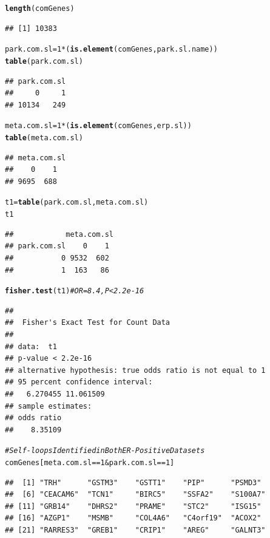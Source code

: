 \documentclass{article}\usepackage[]{graphicx}\usepackage[]{color}
\makeatletter
\newcommand{\hlnum}[1]{\textcolor[rgb]{0.686,0.059,0.569}{#1}}%
\newcommand{\hlcom}[1]{\textcolor[rgb]{0.678,0.584,0.686}{\textit{#1}}}%
\newcommand{\hlopt}[1]{\textcolor[rgb]{0,0,0}{#1}}%
\newcommand{\hlstd}[1]{\textcolor[rgb]{0.345,0.345,0.345}{#1}}%
\newcommand{\hlkwb}[1]{\textcolor[rgb]{0.69,0.353,0.396}{#1}}%
\newcommand{\hlkwd}[1]{\textcolor[rgb]{0.737,0.353,0.396}{\textbf{#1}}}%
\newenvironment{kframe}{%
 \def\at@end@of@kframe{}%
 \ifinner\ifhmode%
  \def\at@end@of@kframe{\end{minipage}}%
  \begin{minipage}{\columnwidth}%
 \fi\fi%
 \def\FrameCommand##1{\hskip\@totalleftmargin \hskip-\fboxsep
 \colorbox{shadecolor}{##1}\hskip-\fboxsep
     \hskip-\linewidth \hskip-\@totalleftmargin \hskip\columnwidth}%
 \MakeFramed {\advance\hsize-\width
   \@totalleftmargin\z@ \linewidth\hsize
   \@setminipage}}%
 {\par\unskip\endMakeFramed%
 \at@end@of@kframe}
\newenvironment{knitrout}{}{} %
\makeatother
\begin{document}
\begin{knitrout}
\begin{kframe}
\begin{alltt}
\hlkwd{length}\hlstd{(comGenes)}
\end{alltt}
\begin{verbatim}
## [1] 10383
\end{verbatim}
\begin{alltt}
\hlstd{park.com.sl}\hlkwb{=}\hlnum{1}\hlopt{*}\hlstd{(}\hlkwd{is.element}\hlstd{(comGenes,park.sl.name))}
\hlkwd{table}\hlstd{(park.com.sl)}
\end{alltt}
\begin{verbatim}
## park.com.sl
##     0     1 
## 10134   249
\end{verbatim}
\begin{alltt}
\hlstd{meta.com.sl}\hlkwb{=}\hlnum{1}\hlopt{*}\hlstd{(}\hlkwd{is.element}\hlstd{(comGenes,erp.sl))}
\hlkwd{table}\hlstd{(meta.com.sl)}
\end{alltt}
\begin{verbatim}
## meta.com.sl
##    0    1 
## 9695  688
\end{verbatim}
\begin{alltt}
\hlstd{t1}\hlkwb{=}\hlkwd{table}\hlstd{(park.com.sl,meta.com.sl)}
\hlstd{t1}
\end{alltt}
\begin{verbatim}
##            meta.com.sl
## park.com.sl    0    1
##           0 9532  602
##           1  163   86
\end{verbatim}
\begin{alltt}
\hlkwd{fisher.test}\hlstd{(t1)} \hlcom{#OR = 8.4, P < 2.2 e-16}
\end{alltt}
\begin{verbatim}
## 
## 	Fisher's Exact Test for Count Data
## 
## data:  t1
## p-value < 2.2e-16
## alternative hypothesis: true odds ratio is not equal to 1
## 95 percent confidence interval:
##   6.270455 11.061509
## sample estimates:
## odds ratio 
##    8.35109
\end{verbatim}
\begin{alltt}
\hlcom{# Self-loops Identified in Both ER-Positive Datasets}
\hlstd{comGenes[meta.com.sl} \hlopt{==} \hlnum{1} \hlopt{&} \hlstd{park.com.sl} \hlopt{==}\hlnum{1}\hlstd{]}
\end{alltt}
\begin{verbatim}
##  [1] "TRH"      "GSTM3"    "GSTT1"    "PIP"      "PSMD3"   
##  [6] "CEACAM6"  "TCN1"     "BIRC5"    "SSFA2"    "S100A7"  
## [11] "GRB14"    "DHRS2"    "PRAME"    "STC2"     "ISG15"   
## [16] "AZGP1"    "MSMB"     "COL4A6"   "C4orf19"  "ACOX2"   
## [21] "RARRES3"  "GREB1"    "CRIP1"    "AREG"     "GALNT3"  

\end{verbatim}
\end{kframe}
\end{knitrout}
\end{document}
